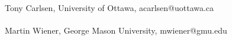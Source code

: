 \documentclass[12pt]{article}
\begin{document}
\\
Tony Carlsen, University of Ottawa, acarlsen@uottawa.ca
\\
\\
Martin Wiener, George Mason University, mwiener@gmu.edu
\end{document}
